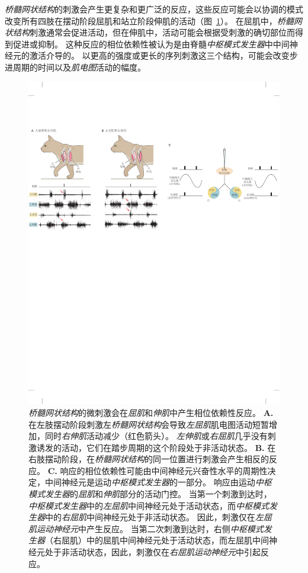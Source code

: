\textit{桥髓网状结构}的刺激会产生更复杂和更广泛的反应，这些反应可能会以协调的模式改变所有四肢在摆动阶段屈肌和站立阶段伸肌的活动（图~\ref{fig:33_13}）。
在屈肌中，\textit{桥髓网状结构}刺激通常会促进活动，但在伸肌中，活动可能会根据受刺激的确切部位而得到促进或抑制。
这种反应的相位依赖性被认为是由脊髓\textit{中枢模式发生器}中中间神经元的激活介导的。
以更高的强度或更长的序列刺激这三个结构，可能会改变步进周期的时间以及\textit{肌电图}活动的幅度。


\begin{figure}[htbp]
	\centering
	\includegraphics[width=1.0\linewidth]{chap33/fig_33_13}
	\caption{\textit{桥髓网状结构}的微刺激会在\textit{屈肌}和\textit{伸肌}中产生相位依赖性反应。
		\textbf{A.} 在左肢摆动阶段刺激左\textit{桥髓网状结构}会导致\textit{左屈肌}肌电图活动短暂增加，同时\textit{右伸肌}活动减少（红色箭头）。
		\textit{左伸肌}或\textit{右屈肌}几乎没有刺激诱发的活动，它们在踏步周期的这个阶段处于非活动状态。
		\textbf{B.} 在右肢摆动阶段，在\textit{桥髓网状结构}的同一位置进行刺激会产生相反的反应。
		\textbf{C.} 响应的相位依赖性可能由中间神经元兴奋性水平的周期性决定，中间神经元是运动\textit{中枢模式发生器}的一部分。
		响应由运动\textit{中枢模式发生器}的\textit{屈肌}和\textit{伸肌}部分的活动门控。
		当第一个刺激到达时，\textit{中枢模式发生器}中的\textit{左屈肌}中间神经元处于活动状态，而\textit{中枢模式发生器}中的\textit{右屈肌}中间神经元处于非活动状态。
		因此，刺激仅在\textit{左屈肌运动神经元}中产生反应。
		当第二次刺激到达时，右侧\textit{中枢模式发生器}（右屈肌）中的屈肌中间神经元处于活动状态，而左屈肌中间神经元处于非活动状态，因此，刺激仅在\textit{右屈肌运动神经元}中引起反应。}
	\label{fig:33_13}
\end{figure}


